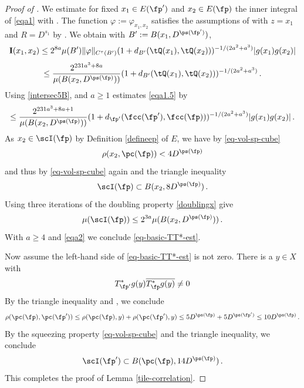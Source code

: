 \begin{proof}[Proof of ]
We estimate for fixed $x_1\in E(\fp')$ and
$x_2\in E(\fp)$ the inner integral of \eqref{eqa1} with
. The function
$\varphi:=\varphi_{x_1,x_2}$ satisfies the assumptions of
 with $z = x_1$ and $R = D^{s_1}$ by .
We obtain with $B':= B(x_1, D^{\ps(\fp')})$,
\begin{equation*}
 {\bf I}(x_1, x_2) \le 2^{8a} \mu(B') \|{\varphi}\|_{C^\tau(B')}
       (1 + d_{B'}(\tQ(x_1),\tQ(x_2)))^{-1/(2a^2+a^3)}|g(x_1)g(x_2)|
\end{equation*}
\begin{equation}
\label{eqa1.5}
 \le \frac{2^{231a^3+8a}}
 {\mu(B(x_2, D^{\ps(\fp)}))}
       (1 + d_{B'}(\tQ(x_1),\tQ(x_2)))^{-1/(2a^2+a^3)}\,.
\end{equation}
Using \eqref{intersec5B},  and $a\ge 1$ estimates \eqref{eqa1.5} by
\begin{equation}\label{eqa2}
 \le \frac{2^{231a^3 + 8a + 1}}
 {\mu(B(x_2, D^{\ps(\fp)}))}
       (1+d_{\fp'}(\fcc(\fp'), \fcc(\fp)))^{-1/(2a^2+a^3)}|g(x_1)g(x_2)|\,.
\end{equation}
As $x_2\in \scI(\fp)$ by Definition \eqref{defineep} of $E$, we have by \eqref{eq-vol-sp-cube}
\begin{equation}
    \rho(x_2,\pc(\fp)) < 4D^{\ps(\fp)}
\end{equation}
and thus by \eqref{eq-vol-sp-cube} again and the triangle inequality
\begin{equation}
    \scI(\fp)\subset B(x_2,8D^{\ps(\fp)})\, .
\end{equation}
Using three iterations of the doubling property \eqref{doublingx} give
\begin{equation}
    \mu(\scI(\fp))\le 2^{3a}\mu(B(x_2,D^{\ps(\fp)}))\, .
\end{equation}
With $a\ge 4$ and \eqref{eqa2} we conclude \eqref{eq-basic-TT*-est}.


Now assume the left-hand side of \eqref{eq-basic-TT*-est} is not zero.
There is a $y\in X$ with
\begin{equation}
    T^*_{\fp'}g(y)\overline{T^*_{\fp}g(y)}\neq 0
\end{equation}
By the triangle inequality and , we conclude
\begin{equation}
   \rho(\pc(\fp),\pc(\fp'))\le \rho(\pc(\fp),y) +\rho(\pc(\fp'),y)
   \le 5D^{\ps(\fp)}+5D^{\ps(\fp')}\le 10 D^{\ps(\fp)}\, .
\end{equation}
By the squeezing property \eqref{eq-vol-sp-cube} and the triangle inequality,
we conclude
\begin{equation}
    \scI(\fp') \subset B(\pc(\fp), 14D^{\ps(\fp)})\, .
\end{equation}
   This completes the proof of Lemma \ref{tile-correlation}.
\end{proof}




